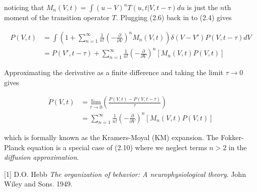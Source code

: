 \documentclass{ucetd}
\begin{document}
\begin{appendices}
noticing that $M_{n}(V,t) = \int(u-V)^{n}T(u, t | V, t-\tau)du$ is just the $n$th moment of the transition operator $T$. Plugging (2.6) back in to (2.4) gives 

\begin{align}
P(V, t) &= \int \left(1 + \sum_{n=1}^{\infty} \frac{1}{n!}\left(-\frac{\partial}{\partial V}\right)^{n} M_{n}(V,t)\right)\delta(V-V')P(V, t-\tau)dV\\
&= P(V', t-\tau) + \sum_{n=1}^{\infty} \frac{1}{n!}\left(-\frac{\partial}{\partial V}\right)^{n} \left[M_{n}(V,t)P(V,t)\right]
\end{align} 

Approximating the derivative as a finite difference and taking the limit $\tau\rightarrow 0$ gives

\begin{align}
\dot{P}(V,t)  &= \underset{\tau\rightarrow 0}{\mathrm{lim}}\left(\frac{P(V, t)-P(V, t-\tau)}{\tau}\right)\\
&= \sum_{n=1}^{\infty} \frac{1}{n!}\left(-\frac{\partial}{\partial V}\right)^{n} \left[M_{n}(V,t)P(V,t)\right]
\end{align} 

which is formally known as the Kramers-Moyal (KM) expansion. The Fokker-Planck equation is a special case of (2.10) where we neglect terms $n>2$ in the \emph{diffusion approximation}.
\end{appendices}

\makebibliography

[1] D.O. Hebb \textit{The organization of behavior: A neurophysiological theory}. John Wiley and Sons. 1949.


%
%
\end{document}
